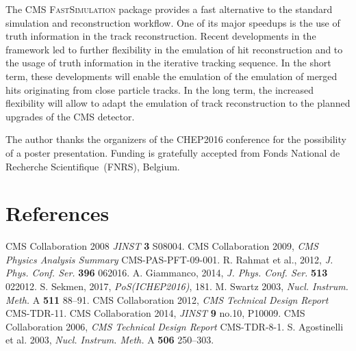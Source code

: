 \documentclass[a4paper]{jpconf}
\begin{document}
The CMS \textsc{FastSimulation} package provides a fast alternative to the standard simulation and reconstruction workflow. One of its major speedups is the use of truth information in the track reconstruction. Recent developments in the framework led to further flexibility in the emulation of hit reconstruction and to the usage of truth information in the iterative tracking sequence. In the short term, these developments will enable the emulation of the emulation of merged hits originating from close particle tracks. In the long term, the increased flexibility will allow to adapt the emulation of track reconstruction to the planned upgrades of the CMS detector.

\ack
The author thanks the organizers of the \textsc{CHEP2016} conference for the possibility of a poster presentation. Funding is gratefully accepted from Fonds National de Recherche Scientifique~(FNRS), Belgium.


\section{References}
\begin{thebibliography}{99}
 CMS Collaboration 2008 {\it JINST} \textbf{3} S08004.
 CMS Collaboration 2009, {\it CMS Physics Analysis Summary} CMS-PAS-PFT-09-001.
 R. Rahmat et al., 2012, {\it J. Phys. Conf. Ser.} \textbf{396} 062016.
 A. Giammanco, 2014, {\it J. Phys. Conf. Ser.} \textbf{513} 022012.
 S. Sekmen, 2017, {\it PoS(ICHEP2016)}, 181.
 M. Swartz 2003, {\it Nucl. Instrum. Meth.} A \textbf{511} 88--91.
 CMS Collaboration 2012, {\it CMS Technical Design Report} CMS-TDR-11.
 CMS Collaboration 2014, {\it JINST} \textbf{9} no.10, P10009.
 CMS Collaboration 2006, {\it CMS Technical Design Report} CMS-TDR-8-1.
 S. Agostinelli et al. 2003, {\it Nucl. Instrum. Meth.} A \textbf{506} 250--303. 

\end{thebibliography}
\end{document}
